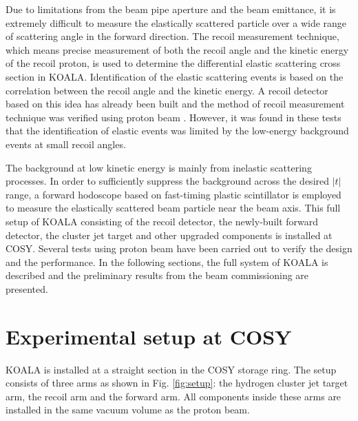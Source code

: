 \documentclass[number,5p]{elsarticle}
\begin{document}
Due to limitations from the beam pipe aperture and the beam emittance,
it is extremely difficult to measure the elastically scattered particle over a wide range of scattering angle in the forward direction.
The recoil measurement technique, which means precise measurement of both the recoil angle and the kinetic energy of the recoil proton, 
is used to determine the differential elastic scattering cross section in KOALA.
Identification of the elastic scattering events is based on the correlation between the recoil angle and the kinetic energy.
A recoil detector based on this idea has already been built and the method of
recoil measurement technique was verified using proton beam
\cite{koala_article,recoil_article}.
However, it was found in these tests that the identification of elastic events was limited by the low-energy
background events at small recoil angles.

The background at low kinetic energy is mainly from inelastic scattering processes.
In order to sufficiently suppress the background across the desired $|t|$ range,
a forward hodoscope based on fast-timing plastic scintillator is
employed to measure the elastically scattered beam particle near the beam axis.
This full setup of KOALA consisting of the recoil detector, the newly-built
forward detector, the cluster jet target and other upgraded components is installed at COSY.
Several tests using proton beam have been carried out to verify the design and the performance.
In the following sections,  the full system of KOALA is described and the preliminary results from the beam commissioning are presented.

\section{Experimental setup at COSY}
\label{sec:setup}

KOALA is installed at a straight section in the COSY storage ring.
The setup consists of three arms as shown in Fig. \ref{fig:setup}: the hydrogen
cluster jet target arm, the recoil arm and the forward arm.
All components inside these arms are installed in the same vacuum volume as the
proton beam.
\end{document}
